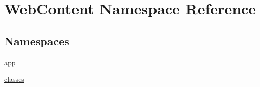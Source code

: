 \hypertarget{namespace_web_content}{}\section{Web\+Content Namespace Reference}
\label{namespace_web_content}
\subsection*{Namespaces}
\begin{DoxyCompactItemize}
\item 
 \hyperlink{namespace_web_content_1_1app}{app}
\item 
 \hyperlink{namespace_web_content_1_1classes}{classes}
\end{DoxyCompactItemize}
